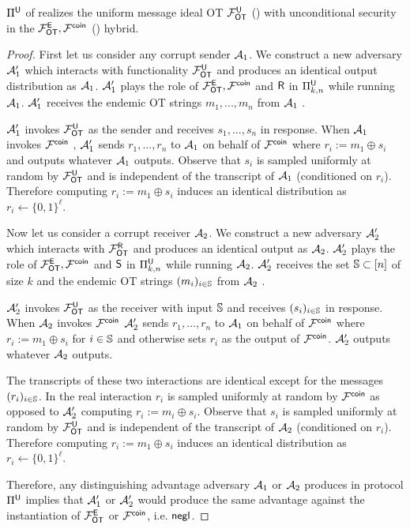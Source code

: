 \begin{lemma}\label{lem:EtoU}
	$\Pi^{\mathsf{U}}$ of  realizes the uniform message ideal OT $\mathcal{F}_{\mathsf{OT}}^{\mathsf{U}}$ () with unconditional security in the $\mathcal{F}_{\mathsf{OT}}^\mathsf{E},\mathcal{F}^{\mathsf{coin}}$ () hybrid.
\end{lemma}
\iffullversion
\begin{proof}
	First let us consider any corrupt sender $\mathcal{A}_1$. We construct a new adversary $\mathcal{A}_1'$ which interacts with functionality $\mathcal{F}_{\mathsf{OT}}^{\mathsf{U}}$ and produces an identical output distribution as $\mathcal{A}_1$.  $\mathcal{A}_1'$ plays the role of $\mathcal{F}_{\mathsf{OT}}^\mathsf{E},\mathcal{F}^{\mathsf{coin}}$ and $\mathsf{R}$ in $\Pi^{\mathsf{U}}_{k,n}$ while running $\mathcal{A}_1$. $\mathcal{A}_1'$ receives the endemic OT strings $m_1,...,m_n$ from $\mathcal{A}_1$%
.
	
	
	$\mathcal{A}_1'$ invokes $\mathcal{F}_{\mathsf{OT}}^{\mathsf{U}}$ as the sender and receives $s_1,...,s_n$ in response. When $\mathcal{A}_1$ invokes $\mathcal{F}^{\mathsf{coin}}$%
, $\mathcal{A}_1'$ sends $r_1,...,r_n$ to $\mathcal{A}_1$ on behalf of $\mathcal{F}^{\mathsf{coin}}$ where $r_i:=m_1\oplus s_i$ and outputs whatever $\mathcal{A}_1$ outputs. Observe that $s_i$ is sampled uniformly at random by $\mathcal{F}_{\mathsf{OT}}^{\mathsf{U}}$ and is independent of the transcript of $\mathcal{A}_1$ (conditioned on $r_i$). Therefore computing $r_i:=m_1\oplus s_i$ induces an identical distribution as $r_i\gets\{0,1\}^\ell$.
	
	Now let us consider a corrupt receiver $\mathcal{A}_2$. We construct a new adversary $\mathcal{A}_2'$ which interacts with $\mathcal{F}_{\mathsf{OT}}^{\mathsf{R}}$ and produces an identical output as $\mathcal{A}_2$. $\mathcal{A}_2'$ plays the role of $\mathcal{F}_{\mathsf{OT}}^\mathsf{E},\mathcal{F}^{\mathsf{coin}}$ and $\mathsf{S}$ in $\Pi^{\mathsf{U}}_{k,n}$ while running $\mathcal{A}_2$. $\mathcal{A}_2'$ receives the set $\mathsf{\mathbb S}\subset[n]$ of size $k$ and the endemic OT strings $(m_i)_{i\in \mathsf{\mathbb S}}$ from $\mathcal{A}_2$%
. 
	
	
	$\mathcal{A}_2'$ invokes  $\mathcal{F}_{\mathsf{OT}}^{\mathsf{U}}$ as the receiver with input $\mathsf{\mathbb S}$ and receives $(s_i)_{i\in\mathsf{\mathbb S}}$ in response. When $\mathcal{A}_2$ invokes $\mathcal{F}^{\mathsf{coin}}$%
	$\mathcal{A}_2'$ sends $r_1,...,r_n$ to $\mathcal{A}_1$ on behalf of $\mathcal{F}^{\mathsf{coin}}$ where $r_i:=m_1\oplus s_i$ for $i\in \mathsf{\mathbb S}$ and otherwise sets $r_i$ as the output of $\mathcal{F}^\mathsf{coin}$. $\mathcal{A}_2'$ outputs whatever $\mathcal{A}_2$ outputs.
	
	The transcripts of these two interactions are identical except for the messages $(r_i)_{i\in \mathsf{\mathbb S}}$. In the real interaction $r_i$ is sampled uniformly at random by $\mathcal{F}^{\mathsf{coin}}$ as opposed to $\mathcal{A}_2'$ computing $r_i:=m_i\oplus s_i$. Observe that $s_i$ is sampled uniformly at random by $\mathcal{F}_{\mathsf{OT}}^{\mathsf{U}}$ and is independent of the transcript of $\mathcal{A}_2$ (conditioned on $r_i$). Therefore computing $r_i:=m_1\oplus s_i$ induces an identical distribution as $r_i\gets\{0,1\}^\ell$.

	Therefore, any distinguishing advantage adversary $\mathcal{A}_1$ or $\mathcal{A}_2$ produces in protocol $\Pi^{\mathsf{U}}$ implies that $\mathcal{A}_1'$ or $\mathcal{A}_2'$ would produce the same advantage against the instantiation of $\mathcal{F}_{\mathsf{OT}}^\mathsf{E}$ or $\mathcal{F}^\mathsf{coin}$, i.e. $\mathsf{negl}$.
	
\end{proof}
